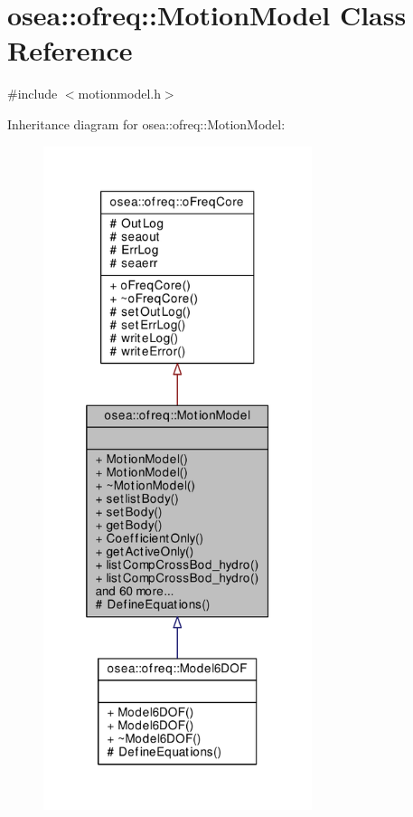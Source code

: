 \hypertarget{classosea_1_1ofreq_1_1_motion_model}{\section{osea\-:\-:ofreq\-:\-:Motion\-Model Class Reference}
\label{classosea_1_1ofreq_1_1_motion_model}
}


{\ttfamily \#include $<$motionmodel.\-h$>$}



Inheritance diagram for osea\-:\-:ofreq\-:\-:Motion\-Model\-:
\nopagebreak
\begin{figure}[H]
\begin{center}
\leavevmode
\includegraphics[height=550pt]{classosea_1_1ofreq_1_1_motion_model__inherit__graph}
\end{center}
\end{figure}
